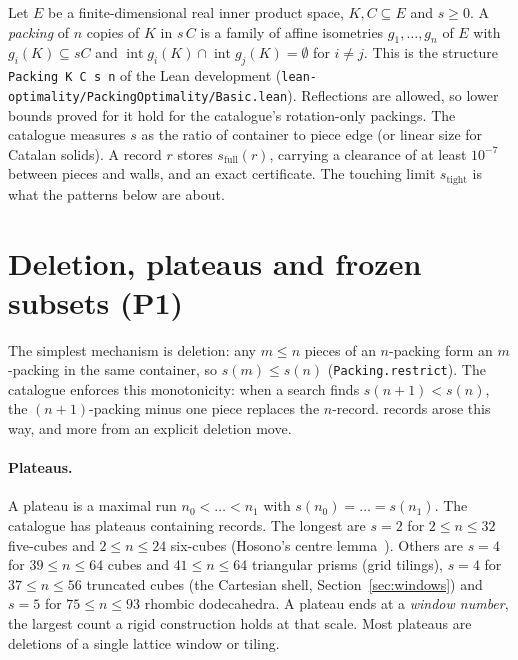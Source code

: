\documentclass[11pt,a4paper]{article}
\newcommand{\code}[1]{\texttt{\nolinkurl{#1}}}
\newcommand{\lean}[1]{\texttt{#1}}
\theoremstyle{definition}
\theoremstyle{remark}
\begin{document}
Let $E$ be a finite-dimensional real inner product space, $K,C\subseteq E$ and $s\ge 0$. A \emph{packing} of $n$ copies of $K$ in $s\,C$ is a family of affine isometries $g_1,\dots,g_n$ of $E$ with $g_i(K)\subseteq sC$ and $\operatorname{int} g_i(K)\cap \operatorname{int} g_j(K)=\emptyset$ for $i\neq j$. This is the structure \lean{Packing K C s n} of the Lean development (\code{lean-optimality/PackingOptimality/Basic.lean}). Reflections are allowed, so lower bounds proved for it hold for the catalogue's rotation-only packings. The catalogue measures $s$ as the ratio of container to piece edge (or linear size for Catalan solids). A record $r$ stores $s_{\mathrm{full}}(r)$, carrying a clearance of at least $10^{-7}$ between pieces and walls, and an exact certificate. The touching limit $s_{\mathrm{tight}}$ is what the patterns below are about.

\section{Deletion, plateaus and frozen subsets (P1)}\label{sec:deletion}

The simplest mechanism is deletion: any $m\le n$ pieces of an $n$-packing form an $m$-packing in the same container, so $s(m)\le s(n)$ (\lean{Packing.restrict}). The catalogue enforces this monotonicity: when a search finds $s(n+1)<s(n)$, the $(n+1)$-packing minus one piece replaces the $n$-record. \nMonotone{} records arose this way, and \nDescend{} more from an explicit deletion move.

\paragraph{Plateaus.} A plateau is a maximal run $n_0<\dots<n_1$ with $s(n_0)=\dots=s(n_1)$. The catalogue has \nPlateaus{} plateaus containing \nPlateauRecords{} records. The longest are $s=2$ for $2\le n\le 32$ five-cubes and $2\le n\le 24$ six-cubes (Hosono's centre lemma~\cite{hosono}). Others are $s=4$ for $39\le n\le 64$ cubes and $41\le n\le 64$ triangular prisms (grid tilings), $s=4$ for $37\le n\le 56$ truncated cubes (the Cartesian shell, Section~\ref{sec:windows}) and $s=5$ for $75\le n\le 93$ rhombic dodecahedra. A plateau ends at a \emph{window number}, the largest count a rigid construction holds at that scale. Most plateaus are deletions of a single lattice window or tiling.
\end{document}
